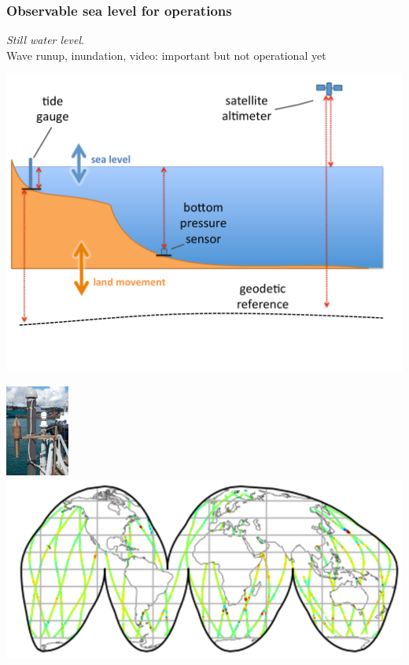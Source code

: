 \begin{frame}
\frametitle{Observable sea level for operations}
\emph{Still water level}.\\
Wave runup, inundation, video: important but not operational yet
\begin{minipage}{0.6\textwidth}
    \includegraphics[width=\textwidth]{figures/diagrams/sealevel_cartoon.pdf}
\end{minipage}
\begin{minipage}{0.35\textwidth}
    \includegraphics[height=3cm]{figures/images/tidegaugeEg.png}
    \vspace{1cm}
    \includegraphics[width=\textwidth]{figures/maps/altimeterCoverageEg.png}
\end{minipage}
\end{frame}
